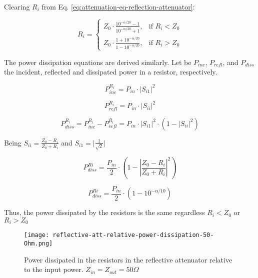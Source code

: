 \noindent Clearing $R_i$ from Eq. \ref{eq:attenuation-eq-reflection-attenuator}:

\begin{equation}
    R_i = \begin{cases} Z_0 \cdot \frac{10^{-\alpha/20} - 1}{10^{-\alpha/20} + 1}, & \text{if  } R_i <  Z_0 \\ Z_0 \cdot \frac{1 + 10^{-\alpha/20}}{1 - 10^{-\alpha/20}}, & \text{if  } R_i > Z_0 \end{cases}
\end{equation}

\noindent The power dissipation equations are derived similarly. Let be $P_{inc}$, $P_{refl}$, and $P_{diss}$ the incident, reflected and dissipated power in a resistor, respectively.

\begin{equation}
    P_{inc}^{R_i} = P_{in} \cdot \lvert S_{i1} \rvert^2
\end{equation}

\begin{equation}
    P_{refl}^{R_i} = P_{in} \cdot \lvert S_{ii} \rvert^2
\end{equation}

\begin{equation}
    P_{diss}^{R_i} = P_{inc}^{R_i} - P_{refl}^{R_i} = P_{in} \cdot \lvert S_{i1} \rvert^2 \cdot (1 - \lvert S_{ii} \rvert^2)
\end{equation}

\noindent Being $S_{ii} = \frac{Z_0 - R_i}{Z_0 + R_i}$ and $S_{i1} = \lvert \frac{1}{\sqrt{2}}\rvert$

\begin{equation}
    P_{diss}^{Ri} = \frac{P_{in}}{2} \cdot \left( 1  - \left| \frac{Z_0 - R_i}{Z_0 + R_i}\right|^2\right)
\end{equation}

\begin{equation}
    P_{diss}^{Ri} = \frac{P_{in}}{2} \cdot \left( 1 - 10^{-\alpha/10}\right)
\end{equation}

\noindent Thus, the power dissipated by the resistors is the same regardless $R_i < Z_0$ or $R_i > Z_0$

\begin{figure}[ht]
    \centering
    \texttt{[image: reflective-att-relative-power-dissipation-50-Ohm.png]}
    \caption{Power dissipated in the resistors in the reflective attenuator relative to the input power. $Z_{in} = Z_{out} = 50 \Omega$}
    \label{fig:reflective-att-relative-power-dissipation-50-Ohm}
\end{figure}
